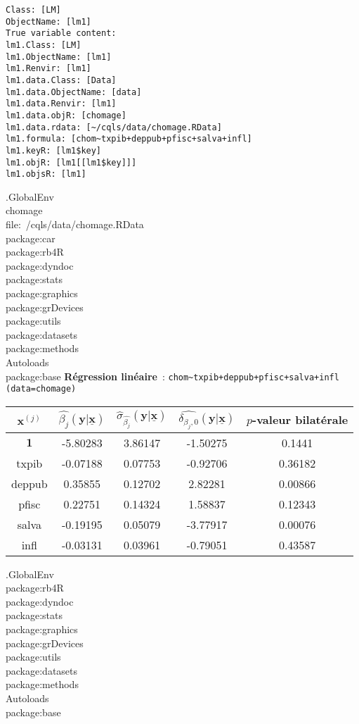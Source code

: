 \documentclass[]{article}
\begin{document}
\begin{verbatim}
Class: [LM]
ObjectName: [lm1]
True variable content: 
lm1.Class: [LM]
lm1.ObjectName: [lm1]
lm1.Renvir: [lm1]
lm1.data.Class: [Data]
lm1.data.ObjectName: [data]
lm1.data.Renvir: [lm1]
lm1.data.objR: [chomage]
lm1.data.rdata: [~/cqls/data/chomage.RData]
lm1.formula: [chom~txpib+deppub+pfisc+salva+infl]
lm1.keyR: [lm1$key]
lm1.objR: [lm1[[lm1$key]]]
lm1.objsR: [lm1]
\end{verbatim}
.GlobalEnv\\chomage\\file:~/cqls/data/chomage.RData\\package:car\\package:rb4R\\package:dyndoc\\package:stats\\package:graphics\\package:grDevices\\package:utils\\package:datasets\\package:methods\\Autoloads\\package:base
\noindent \textbf{Régression linéaire}~: \verb$chom~txpib+deppub+pfisc+salva+infl$ \texttt{(data=chomage)}\\\begin{tabular}{|c|c|c|c|c|}\hline
$\mathbf{x}^{(j)}$ & $\widehat{\beta_j}(\mathbf{y}|\underline{\mathbf{x}})$ 
& $\widehat{\sigma}_{\widehat{\beta_j}}(\mathbf{y}|\underline{\mathbf{x}})$ 
& $\widehat{\delta_{\beta_j,0}}(\mathbf{y}|\underline{\mathbf{x}})$ 
&$p$-valeur bilatérale\\\hline
$\mathbf{1}$ & -5.80283 & 3.86147 & -1.50275 & 0.1441 \\ \hline
txpib & -0.07188 & 0.07753 & -0.92706 & 0.36182 \\ \hline
deppub & 0.35855 & 0.12702 & 2.82281 & 0.00866 \\ \hline
pfisc & 0.22751 & 0.14324 & 1.58837 & 0.12343 \\ \hline
salva & -0.19195 & 0.05079 & -3.77917 & 0.00076 \\ \hline
infl & -0.03131 & 0.03961 & -0.79051 & 0.43587 \\ \hline
\end{tabular}

.GlobalEnv\\package:rb4R\\package:dyndoc\\package:stats\\package:graphics\\package:grDevices\\package:utils\\package:datasets\\package:methods\\Autoloads\\package:base
\end{document}
